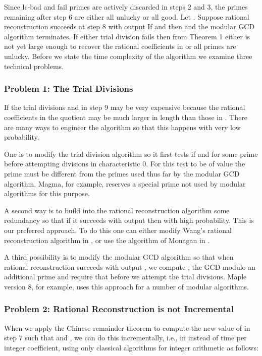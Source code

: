 \documentclass[10pt]{article}
\begin{document}
Since lc-bad and fail primes are actively discarded in steps 2 and 3,
the primes  remaining after step 6 are
either all unlucky or all good.  Let .
Suppose rational reconstruction succeeds at step 8 with output 
If  and  then  and the modular GCD algorithm terminates.
If either trial division fails then from Theorem 1
either  is not yet large enough to recover the rational
coefficients in  or all primes are unlucky.
Before we state the time complexity of the algorithm
we examine three technical problems.

\subsubsection*{Problem 1: The Trial Divisions}
If  the trial divisions  and  in step 9 may
be very expensive because the rational coefficients in the quotient
 may be much larger in length than those in .
There are many ways to engineer the algorithm so that this
happens with very low probability.

One is to modify the trial division algorithm so it first
tests if  and  for some prime  before
attempting divisions in characteristic 0.  For this test to be of value
the prime  must be different from the primes used thus far
by the modular GCD algorithm.  Magma, for example, reserves
a special prime not used by modular algorithms for this purpose.

A second way is to build into the rational reconstruction algorithm
some redundancy so that if it succeeds with output  then 
with high probability. This is our preferred approach.  To do this
one can either modify Wang's rational reconstruction algorithm in
\cite{Wang81,Wang}, or use the algorithm of Monagan in \cite{MQRR}.

A third possibility is to modify the modular GCD algorithm
so that when rational reconstruction succeeds with output ,
we compute , the GCD modulo an additional prime 
and require that  before we
attempt the trial divisions.  Maple version 8, for example,
uses this approach for a number of modular algorithms.

\subsubsection*{Problem 2: Rational Reconstruction is not Incremental}

When we apply the Chinese remainder theorem to compute the new
value of  in step 7 such that  and
, we can do this incrementally, i.e.,
in  instead of  time per integer coefficient,
using only classical algorithms for integer arithmetic as follows:
\end{document}
